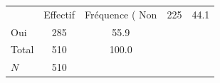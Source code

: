 {
\def\sym#1{\ifmmode^{#1}\else\(^{#1}\)\fi}
\begin{tabular}{l*{1}{cc}}
\toprule
            &    Effectif&Fréquence (%
\midrule
Non         &         225&        44.1\\
Oui         &         285&        55.9\\
Total       &         510&       100.0\\
\midrule
\(N\)       &         510&            \\
\bottomrule
\end{tabular}
}
